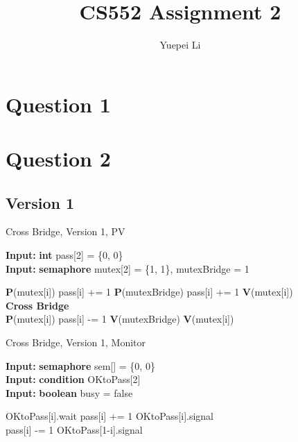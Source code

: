 \documentclass{article}
\title{CS552 Assignment 2}
\author{Yuepei Li}
\renewcommand{\algorithmicrequire}{\textbf{Input: }}
\begin{document}
\maketitle

\section{Question 1}

\section{Question 2}

\subsection{Version 1}

\begin{algorithm}
  \caption{Cross Bridge, Version 1, PV}
  \algorithmicrequire \textbf{int} pass[2] = \{0, 0\} \\
  \algorithmicrequire \textbf{semaphore} mutex[2] = \{1, 1\}, mutexBridge = 1
  \begin{algorithmic}
      \State \textbf{P}(mutex[i])
        \State pass[i] += 1
        \State \textbf{P}(mutexBridge)
      \Else
        \State pass[i] += 1
      \EndIf
      \State \textbf{V}(mutex[i])
      \\
      \State \textbf{Cross Bridge}
      \\
      \State \textbf{P}(mutex[i])
      \State pass[i] -= 1
        \State \textbf{V}(mutexBridge)
      \EndIf
      \State \textbf{V}(mutex[i])
    \EndProcedure
  \end{algorithmic}
\end{algorithm}

\begin{algorithm}
  \caption{Cross Bridge, Version 1, Monitor}
  \algorithmicrequire \textbf{semaphore} sem[] = \{0, 0\} \\
  \algorithmicrequire \textbf{condition} OKtoPass[2] \\
  \algorithmicrequire \textbf{boolean} busy = false

  \begin{algorithmic}
        \State OKtoPass[i].wait
      \EndIf
      \State pass[i] += 1
      \State OKtoPass[i].signal
    \EndProcedure
    \\
      \State pass[i] -= 1
        \State OKtoPass[1-i].signal
      \EndIf
    \EndProcedure
  \end{algorithmic}
\end{algorithm}
\end{document}
